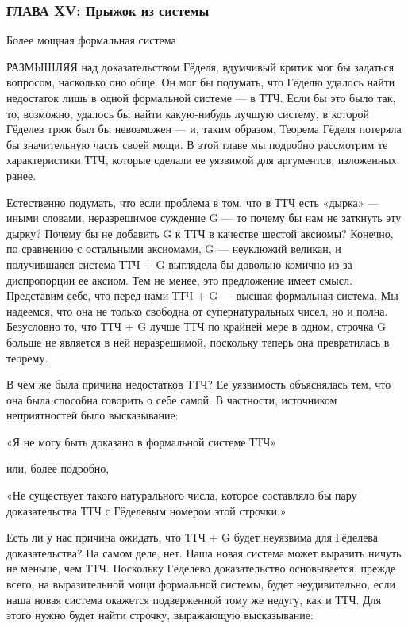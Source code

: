 \subsubsection{ГЛАВА XV: Прыжок из системы}

Более мощная формальная система

РАЗМЫШЛЯЯ над доказательством Гёделя, вдумчивый критик мог бы задаться вопросом, насколько оно обще. Он мог бы подумать, что Гёделю удалось найти недостаток лишь в одной формальной системе --- в ТТЧ. Если бы это было так, то, возможно, удалось бы найти какую-нибудь лучшую систему, в которой Гёделев трюк был бы невозможен --- и, таким образом, Теорема Гёделя потеряла бы значительную часть своей мощи. В этой главе мы подробно рассмотрим те характеристики ТТЧ, которые сделали ее уязвимой для аргументов, изложенных ранее.

Естественно подумать, что если проблема в том, что в ТТЧ есть «дырка» --- иными словами, неразрешимое суждение G --- то почему бы нам не заткнуть эту дырку? Почему бы не добавить G к ТТЧ в качестве шестой аксиомы? Конечно, по сравнению с остальными аксиомами, G --- неуклюжий великан, и получившаяся система ТТЧ + G выглядела бы довольно комично из-за диспропорции ее аксиом. Тем не менее, это предложение имеет смысл. Представим себе, что перед нами ТТЧ + G --- высшая формальная система. Мы надеемся, что она не только свободна от супернатуральных чисел, но и полна. Безусловно то, что ТТЧ + G лучше ТТЧ по крайней мере в одном, строчка G больше не является в ней неразрешимой, поскольку теперь она превратилась в теорему.

В чем же была причина недостатков ТТЧ? Ее уязвимость объяснялась тем, что она была способна говорить о себе самой. В частности, источником неприятностей было высказывание:

«Я не могу быть доказано в формальной системе ТТЧ»

или, более подробно,

«Не существует такого натурального числа, которое составляло бы пару доказательства ТТЧ с Гёделевым номером этой строчки.»

Есть ли у нас причина ожидать, что ТТЧ + G будет неуязвима для Гёделева доказательства? На самом деле, нет. Наша новая система может выразить ничуть не меньше, чем ТТЧ. Поскольку Гёделево доказательство основывается, прежде всего, на выразительной мощи формальной системы, будет неудивительно, если наша новая система окажется подверженной тому же недугу, как и ТТЧ. Для этого нужно будет найти строчку, выражающую высказывание:

